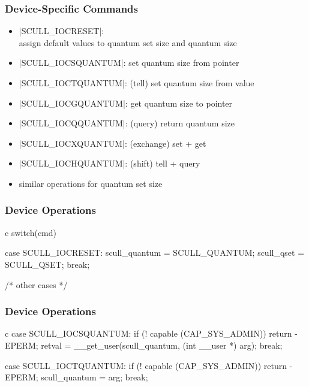 \documentclass[dvipsnames]{beamer}
\begin{document}
\begin{frame}
  \frametitle{Device-Specific Commands}

  \begin{example}
    \begin{itemize}
      \item {}|SCULL_IOCRESET|:\\
        assign default values to quantum set size and quantum size

      \pause
      \medskip
      \item {}|SCULL_IOCSQUANTUM|: set quantum size from pointer
      \item {}|SCULL_IOCTQUANTUM|: (tell) set quantum size from value

      \pause
      \item {}|SCULL_IOCGQUANTUM|: get quantum size to pointer
      \item {}|SCULL_IOCQQUANTUM|: (query) return quantum size

      \pause
      \item {}|SCULL_IOCXQUANTUM|: (exchange) set + get
      \item {}|SCULL_IOCHQUANTUM|: (shift) tell + query

      \pause
      \medskip
      \item similar operations for quantum set size
    \end{itemize}
  \end{example}
\end{frame}

\begin{frame}[fragile]
  \frametitle{Device Operations}

  \begin{example}
    \begin{pygments}{c}
switch(cmd) {
    case SCULL_IOCRESET:
        scull_quantum = SCULL_QUANTUM;
        scull_qset = SCULL_QSET;
        break;

    /* other cases */
}
    \end{pygments}
  \end{example}
\end{frame}

\begin{frame}[fragile]
  \frametitle{Device Operations}

  \begin{example}
    \begin{pygments}{c}
case SCULL_IOCSQUANTUM:
    if (! capable (CAP_SYS_ADMIN))
        return -EPERM;
    retval = __get_user(scull_quantum,
                        (int __user *) arg);
    break;

case SCULL_IOCTQUANTUM:
    if (! capable (CAP_SYS_ADMIN))
        return -EPERM;
    scull_quantum = arg;
    break;
    \end{pygments}
  \end{example}
\end{frame}
\end{document}
